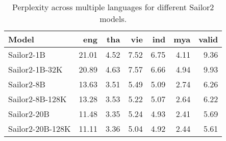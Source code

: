 

\begin{table}[ht]
\centering
\caption{Perplexity across multiple languages for different Sailor2 models.}
\label{tab:long_context_model_ppl}
\renewcommand{\arraystretch}{1.2}  %
\begin{tabular}{lrrrrrr}
\toprule
\textbf{Model} & \textbf{eng} & \textbf{tha} & \textbf{vie} & \textbf{ind} & \textbf{mya} & \textbf{valid} \\
\midrule
\midrule
Sailor2-1B & 21.01 & 4.52 & 7.52 & 6.75 & 4.11 & 9.36 \\
Sailor2-1B-32K & 20.89 & 4.63 & 7.57 & 6.66 & 4.94 & 9.93 \\
\midrule
\midrule
Sailor2-8B & 13.63 & 3.51 & 5.49 & 5.09 & 2.74 & 6.26 \\
Sailor2-8B-128K & 13.28 & 3.53 & 5.22 & 5.07 & 2.64 & 6.22 \\
\midrule
\midrule
Sailor2-20B & 11.48 & 3.35 & 5.24 & 4.93 & 2.41 & 5.69 \\
Sailor2-20B-128K & 11.11 & 3.36 & 5.04 & 4.92 & 2.44 & 5.61 \\
\bottomrule
\end{tabular}
\end{table}
